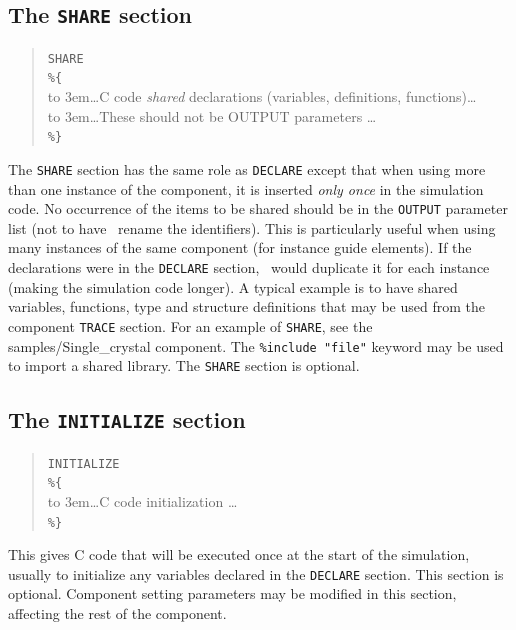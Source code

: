 \subsection{The \texttt{SHARE} section}
\label{s:comp-share}
\begin{quote}
  \texttt{SHARE} \\
  \verb|%{| \\
    \hbox to 3em{}\ldots C code \emph{shared} declarations (variables, definitions, functions)\ldots \\
    \hbox to 3em{}\ldots These should not be OUTPUT parameters \ldots \\
  \verb|%}|
\end{quote}

The \texttt{SHARE} section has the same role as \texttt{DECLARE} except that
when using more than one instance of the component, it is inserted \emph{only
  once} in the simulation code. No occurrence of the items to be shared should be
in the \texttt{OUTPUT} parameter list (not to have \MCS\ rename the
identifiers).  This is particularly useful when using many instances of the same
component (for instance guide elements). If the declarations were in the
\texttt{DECLARE} section, \MCS\ would duplicate it for each instance (making the
simulation code longer).  A typical example is to have shared variables,
functions, type and structure definitions that may be used from the component
\texttt{TRACE} section. For an example of \texttt{SHARE}, see the
samples/Single\_crystal component. The \verb+%include "file"+ keyword may be
used to import
a shared library. The \texttt{SHARE} section is optional.

\subsection{The \texttt{INITIALIZE} section}
\label{s:comp-initialize}

\begin{quote}
  \texttt{INITIALIZE} \\
  \verb|%{| \\
  \hbox to 3em{}\ldots C code initialization \ldots \\
  \verb|%}|
\end{quote}
 This gives C code that will be executed once at the
start of the simulation, usually to initialize any variables declared in the
\texttt{DECLARE} section. This section is optional. Component setting parameters
may be modified in this section, affecting the rest of the component.


